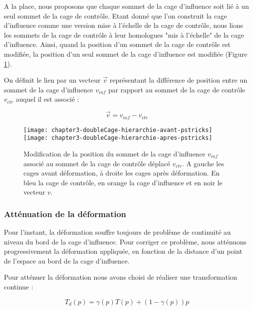 A la place, nous proposons que chaque sommet de la cage d'influence soit lié à
un seul sommet de la cage de contrôle. Etant donné que l'on construit la cage
d'influence comme une version mise à l'échelle de la cage de contrôle, nous
lions les sommets de la cage de contrôle à leur homologues "mis à l'échelle"
de la cage d'influence. Ainsi, quand la position d'un sommet de la cage de
contrôle est modifiée, la position d'un seul sommet de la cage d'influence est
modifiée (Figure \ref{MELHie}).

On définit le lien par un vecteur $\overrightarrow{v}$ représentant la
différence de position entre un sommet de la cage d'influence $v_{inf}$ par
rapport au sommet de la cage de contrôle $v_{ctr}$ auquel il est associé :

\begin{displaymath}
  \overrightarrow{v} = v_{inf}-v_{ctr}
\end{displaymath}

\begin{figure}[ht]
\begin{center}
  \texttt{[image: chapter3-doubleCage-hierarchie-avant-pstricks]}
  \texttt{[image: chapter3-doubleCage-hierarchie-apres-pstricks]}

  \caption[Association des cages de contrôle et d'influence] {Modification de
la position du sommet de la cage d'influence $v_{inf}$ associé au sommet de la
cage de contrôle déplacé $v_{ctr}$. A gauche les cages avant déformation, à
droite les cages après déformation. En bleu la cage de contrôle, en orange la
cage d'influence et en noir le vecteur $v$.}

  \label{MELHie}
\end{center}
\end{figure}

\subsubsection{Atténuation de la déformation}

Pour l'instant, la déformation souffre toujours de problème de continuité au
niveau du bord de la cage d'influence. Pour corriger ce problème, nous
atténuons progressivement la déformation appliquée, en fonction de la distance
d'un point de l'espace au bord de la cage d'influence.

Pour atténuer la déformation nous avons choisi de réaliser une transformation
continue :

\begin{equation}
  T_{d}(p) = \gamma(p) T(p) + (1-\gamma(p)) p
  \label{MELAtt}
\end{equation}

